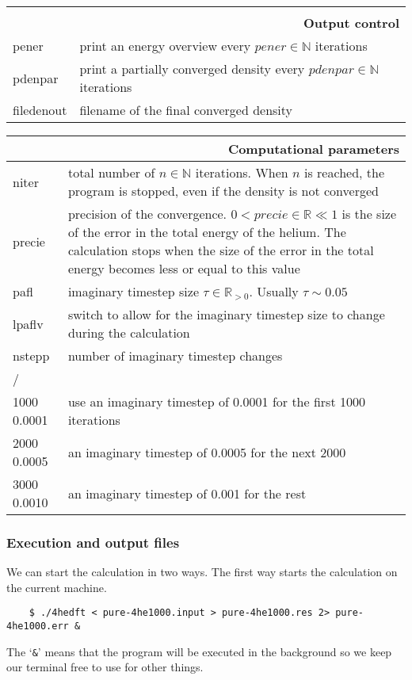 \documentclass[10pt,a4paper]{article}
\begin{document}
\begin{center}
	\begin{tabular}{l|p{9.6cm}}
		\multicolumn{2}{r}{\textbf{}}	\\
		\multicolumn{2}{r}{\textbf{Output control}}	\\
		\hline\hline
		pener & print an energy overview every $pener\in\mathbb{N}$ iterations	\\
		\hline
		pdenpar	& print a partially converged density every $pdenpar\in\mathbb{N}$ iterations	\\
		\hline
		filedenout 	& filename of the final converged density
	\end{tabular}
	\begin{tabular}{l|p{9.6cm}}
		\multicolumn{2}{r}{\textbf{Computational parameters}}	\\
		\hline\hline
		niter		& total number of $n\in\mathbb{N}$ iterations. When $n$ is reached, the program is stopped, even if the density is not converged\\
		\hline
		precie		& precision of the convergence. $0<precie\in\mathbb{R}\ll1$ is the size of the error in the total energy of the helium. The calculation stops when the size of the error in the total energy becomes less or equal to this value \\
		\hline
		pafl		& imaginary timestep size $\tau\in\mathbb{R}_{>0}$. Usually $\tau\sim0.05$\\
		\hline
		lpaflv		& switch to allow for the imaginary timestep size to change during the calculation\\
		\hline
		nstepp		& number of imaginary timestep changes\\
		\hline
		/ & 	\\
		1000 0.0001 & use an imaginary timestep of 0.0001 for the first 1000 iterations \\
		2000 0.0005 & an imaginary timestep of 0.0005 for the next 2000  \\
		3000	0.0010 & an imaginary timestep of 0.001 for the rest
	\end{tabular}
	\end{center}

	\subsubsection{Execution and output files}
	We can start the calculation in two ways. The first way starts the calculation on the current machine.
	\begin{verbatim}
	$ ./4hedft < pure-4he1000.input > pure-4he1000.res 2> pure-4he1000.err &
	\end{verbatim}
	The `\verb|&|' means that the program will be executed in the background so we keep our terminal free to use for other things.
	
\end{document}
